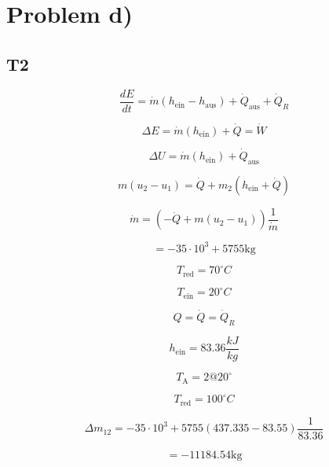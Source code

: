 \section*{Problem d)}

\subsection*{T2}

\begin{equation}
\frac{dE}{dt} = \dot{m} (h_{\text{ein}} - h_{\text{aus}}) + \dot{Q}_{\text{aus}} + \dot{Q}_{R}
\end{equation}

\begin{equation}
\Delta E = \dot{m} (h_{\text{ein}}) + \dot{Q} = \dot{W}
\end{equation}

\begin{equation}
\Delta U = \dot{m} (h_{\text{ein}}) + \dot{Q}_{\text{aus}}
\end{equation}

\begin{equation}
m (u_2 - u_1) = \dot{Q} + m_2 (h_{\text{ein}} + \dot{Q})
\end{equation}

\begin{equation}
\dot{m} = \left( -\dot{Q} + m (u_2 - u_1) \right) \frac{1}{\dot{m}}
\end{equation}

\begin{equation}
= -35 \cdot 10^3 + 5755 \text{kg}
\end{equation}

\begin{equation}
T_{\text{red}} = 70^\circ C
\end{equation}

\begin{equation}
T_{\text{ein}} = 20^\circ C
\end{equation}

\begin{equation}
Q = \dot{Q} = \dot{Q}_R
\end{equation}

\begin{equation}
h_{\text{ein}} = 83.36 \frac{kJ}{kg}
\end{equation}

\begin{equation}
T_{\text{A}} = 2 @ 20^\circ
\end{equation}

\begin{equation}
T_{\text{red}} = 100^\circ C
\end{equation}

\begin{equation}
\Delta m_{12} = -35 \cdot 10^3 + 5755 (437.335 - 83.55) \frac{1}{83.36}
\end{equation}

\begin{equation}
= -11184.54 \text{kg}
\end{equation}